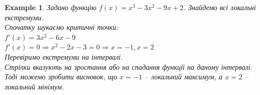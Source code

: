 \documentclass[a4paper, 14pt]{article}
\theoremstyle{theoremdd}
\theoremstyle{theoremdd}
\theoremstyle{theoremdd}
\theoremstyle{theoremdd}
\newtheorem{example}[theorem]{Example}
\theoremstyle{theoremdd}
\theoremstyle{theoremdd}
\theoremstyle{theoremdd}
\theoremstyle{theoremdd}
\begin{document}
\begin{example}
Задано функцію $f(x) = x^3-3x^2-9x+2$. Знайдемо всі локальні екстремуми.\\
Спочатку шукаємо критичні точки:\\
$f'(x) = 3x^2-6x-9$\\
$f'(x) = 0 \Rightarrow x^2-2x-3 = 0 \Rightarrow x = -1,x = 2$\\
Перевіримо екстремуми на інтервалі.
\\ %
Стрілки вказують на зростання або на спадання функції на даному інтервалі. Тоді можемо зробити висновок, що $x=-1$ -- локальний максимум, а $x=2$ -- локальний мінімум.
\end{example}
\end{document}
